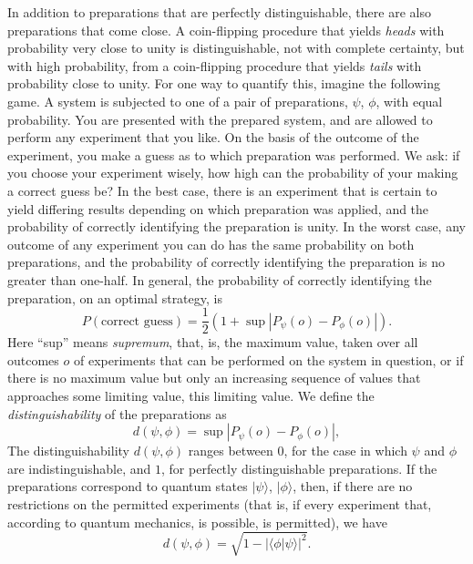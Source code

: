\documentclass[12pt]{article}
\newcommand{\ket}[1]{|#1\rangle}
\newcommand{\bkt}[2]{\langle#1|#2\rangle}
\begin{document}
In addition to preparations that are perfectly distinguishable, there are also preparations that come close.  A coin-flipping procedure that yields \emph{heads} with probability very close to unity is distinguishable, not with complete certainty, but with high probability, from a coin-flipping procedure that yields \emph{tails} with probability close to unity.  For one way to quantify this, imagine the following game. A system is subjected to one of a pair of preparations, $\psi$, $\phi$, with equal probability.  You are presented with the prepared system, and are allowed to perform any experiment that you like. On the basis of the outcome of the experiment, you make a guess as to which preparation was performed.  We ask: if you choose your experiment wisely, how high can the probability of your making a correct guess be?  In the best case, there is an experiment that is certain to yield differing results depending on which preparation was applied, and the probability of correctly identifying the preparation is unity.  In the worst case, any outcome of any experiment you can do has the same probability on both preparations, and the probability of correctly identifying the preparation is no greater than one-half.  In general, the probability of correctly identifying the preparation, on an optimal strategy, is
\begin{equation}
P(\mbox{correct guess}) = \frac{1}{2}\left(1 + \sup \left|P_\psi(o) - P_\phi(o)\right| \right).
\end{equation}
Here ``sup'' means \emph{supremum}, that, is, the maximum value, taken over all outcomes $o$ of experiments that can be performed on the system in question, or if there is no maximum value but only an increasing sequence of values that approaches some limiting value, this  limiting value.  We define the \emph{distinguishability} of the preparations as
\begin{equation}
d(\psi, \phi) =  \sup \left|P_\psi(o) - P_\phi(o)\right|,
\end{equation}
The distinguishability $d(\psi, \phi)$ ranges between $0$, for the case in which $\psi$ and $\phi$ are indistinguishable, and $1$, for perfectly distinguishable preparations.    If the preparations correspond to  quantum states $\ket{\psi}$, $\ket{\phi}$, then, if there are no restrictions on the permitted experiments (that is, if every experiment that, according to quantum mechanics, is possible, is permitted), we have
\begin{equation}\label{QDist}
d(\psi, \phi) = \sqrt{1 - |\bkt{\phi}{\psi}|^2}.
\end{equation}
\end{document}
